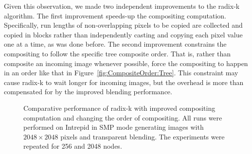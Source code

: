 \documentclass{sig-alternate}
\begin{document}
Given this observation, we made two independent improvements to the radix-k
algorithm.  The first improvement speeds-up the compositing computation.
Specifically, run lengths of non-overlapping pixels to be copied are
collected and copied in blocks rather than independently casting and
copying each pixel value one at a time, as was done before.  The second
improvement constrains the compositing to follow the specific tree
composite order.  That is, rather than composite an incoming image whenever
possible, force the compositing to happen in an order like that in
Figure~\ref{fig:CompositeOrder:Tree}.  This constraint may cause radix-k to
wait longer for incoming images, but the overhead is more than compensated
for by the improved blending performance.

\begin{figure}[htbp]
  \centering

  \caption{Comparative performance of radix-k with improved compositing
    computation and changing the order of compositing.  All runs were
    performed on Intrepid in SMP mode generating images with $2048 \times
    2048$ pixels and transparent blending.  The experiments were repeated
    for 256 and 2048 nodes.}
  \label{fig:IceTCompositeImprovements}
\end{figure}
\end{document}
